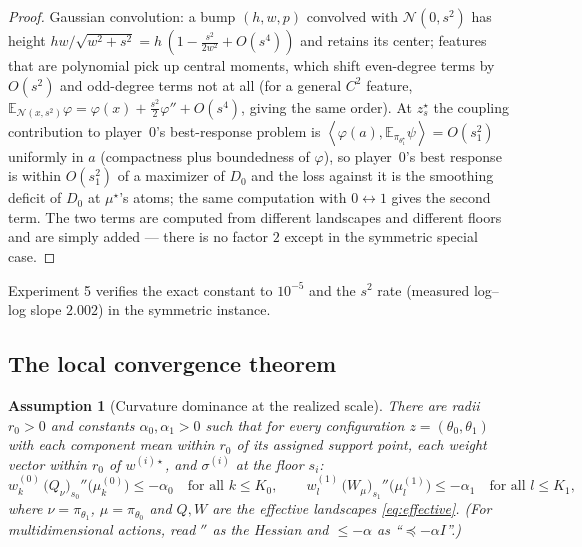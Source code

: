 \documentclass[11pt]{article}
\newtheorem{assumption}{Assumption}
\theoremstyle{definition}
\newcommand{\E}{\mathbb{E}}
\newcommand{\ip}[2]{\left\langle #1, #2 \right\rangle}
\begin{document}
\begin{proof}
Gaussian convolution: a bump $(h, w, p)$ convolved with $\mathcal{N}(0,s^2)$
has height $h w / \sqrt{w^2 + s^2} = h\,(1 - \tfrac{s^2}{2w^2} + O(s^4))$ and
retains its center; features that are polynomial pick up central moments, which
shift even-degree terms by $O(s^2)$ and odd-degree terms not at all (for a
general $C^2$ feature, $\E_{\mathcal{N}(x,s^2)}\varphi = \varphi(x) +
\tfrac{s^2}{2}\varphi'' + O(s^4)$, giving the same order). At $z^\star_s$ the
coupling contribution to player~0's best-response problem is
$\ip{\varphi(a)}{\E_{\pi_{\theta_1^\star}}\psi} = O(s_1^2)$ uniformly in $a$
(compactness plus boundedness of $\varphi$), so player~0's best response is
within $O(s_1^2)$ of a maximizer of $D_0$ and the loss against it is the
smoothing deficit of $D_0$ at $\mu^\star$'s atoms; the same computation with
$0 \leftrightarrow 1$ gives the second term. The two terms are computed from
different landscapes and different floors and are simply added --- there is no
factor $2$ except in the symmetric special case.
\end{proof}

Experiment 5 verifies the exact constant to $10^{-5}$ and the $s^2$ rate
(measured log--log slope $2.002$) in the symmetric instance.

\subsection{The local convergence theorem}

\begin{assumption}[Curvature dominance at the realized scale]\label{ass:curv}
There are radii $r_0 > 0$ and constants $\alpha_0, \alpha_1 > 0$ such that for
every configuration $z = (\theta_0, \theta_1)$ with each component mean within
$r_0$ of its assigned support point, each weight vector within $r_0$ of
$w^{(i)\star}$, and $\sigma^{(i)}$ at the floor $s_i$:
\[
  w^{(0)}_k\, \big(Q_{\nu}\big)_{s_0}''\big(\mu^{(0)}_k\big) \le -\alpha_0
  \quad \text{for all } k \le K_0,
  \qquad
  w^{(1)}_l\, \big(W_{\mu}\big)_{s_1}''\big(\mu^{(1)}_l\big) \le -\alpha_1
  \quad \text{for all } l \le K_1,
\]
where $\nu = \pi_{\theta_1}$, $\mu = \pi_{\theta_0}$ and $Q, W$ are the
effective landscapes \eqref{eq:effective}. (For multidimensional actions,
read $''$ as the Hessian and $\le -\alpha$ as ``$\preceq -\alpha I$''.)
\end{assumption}
\end{document}
